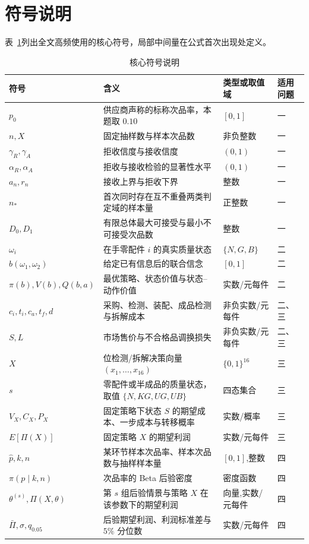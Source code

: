 \section{符号说明}

表~\ref{tab:core-symbols}列出全文高频使用的核心符号，局部中间量在公式首次出现处定义。

\begin{table}[H]
  \centering
  \caption{核心符号说明}
  \label{tab:core-symbols}
  \small
  \begin{tabularx}{\textwidth}{>{\centering\arraybackslash}p{}>{\raggedright\arraybackslash}X>{\centering\arraybackslash}p{}>{\centering\arraybackslash}p{}}
    \toprule
    符号 & 含义 & 类型或取值域 & 适用问题 \\
    \midrule
    $p_0$ & 供应商声称的标称次品率，本题取 $0.10$ & $[0,1]$ & 一 \\
    $n,X$ & 固定抽样数与样本次品数 & 非负整数 & 一 \\
    $\gamma_R,\gamma_A$ & 拒收信度与接收信度 & $(0,1)$ & 一 \\
    $\alpha_R,\alpha_A$ & 拒收与接收检验的显著性水平 & $(0,1)$ & 一 \\
    $a_n,r_n$ & 接收上界与拒收下界 & 整数 & 一 \\
    $n_*$ & 首次同时存在互不重叠两类判定域的样本量 & 正整数 & 一 \\
    $D_0,D_1$ & 有限总体最大可接受与最小不可接受次品数 & 整数 & 一 \\
    $\omega_i$ & 在手零配件 $i$ 的真实质量状态 & $\{N,G,B\}$ & 二 \\
    $b(\omega_1,\omega_2)$ & 给定已有信息后的联合信念 & $[0,1]$ & 二 \\
    $\pi(b),V(b),Q(b,a)$ & 最优策略、状态价值与状态--动作价值 & 实数/元每件 & 二 \\
    $c_i,t_i,c_a,t_f,d$ & 采购、检测、装配、成品检测与拆解成本 & 非负实数/元每件 & 二、三 \\
    $S,L$ & 市场售价与不合格品调换损失 & 非负实数/元每件 & 二、三 \\
    $X$ & 16 位检测/拆解决策向量 $(x_1,\ldots,x_{16})$ & $\{0,1\}^{16}$ & 三 \\
    $s$ & 零配件或半成品的质量状态，取值 $\{N,KG,UG,UB\}$ & 四态集合 & 三 \\
    $V_X,C_X,P_X$ & 固定策略下状态 $S$ 的期望成本、一步成本与转移概率 & 实数/概率 & 三 \\
    $E[\Pi(X)]$ & 固定策略 $X$ 的期望利润 & 实数/元每件 & 三 \\
    $\hat p,k,n$ & 某环节样本次品率、样本次品数与抽样样本量 & $[0,1]$,整数 & 四 \\
    $\pi(p\mid k,n)$ & 次品率的 Beta 后验密度 & 密度函数 & 四 \\
    $\theta^{(s)},\Pi(X,\theta)$ & 第 $s$ 组后验情景与策略 $X$ 在该参数下的期望利润 & 向量,实数/元每件 & 四 \\
    $\bar\Pi,\sigma,q_{0.05}$ & 后验期望利润、利润标准差与 $5\%$ 分位数 & 实数/元每件 & 四 \\
    \bottomrule
  \end{tabularx}
\end{table}
